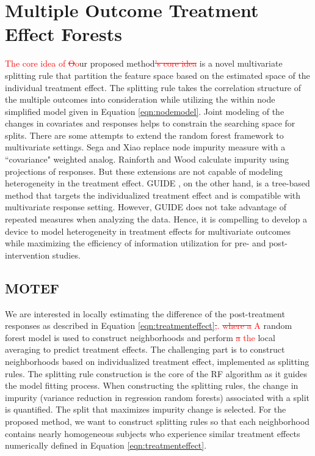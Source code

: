 \documentclass[smallextended]{svjour3}
\newcommand{\bg}[1]{\textcolor{red}{#1}}
\begin{document}
\section{Multiple Outcome Treatment Effect Forests}\label{MOTE}
\bg{The core idea of \st{O}o}ur proposed method\bg{\st{'s core idea}} is a novel multivariate splitting rule that partition the feature space based on the estimated space of the individual treatment effect. The splitting rule takes the correlation structure of the multiple outcomes into consideration while utilizing the within node simplified model given in Equation \eqref{eqn:nodemodel}. Joint modeling of the changes in covariates and responses helps to constrain the searching space for splits. There are some attempts to extend the random forest framework to multivariate settings. Sega and Xiao \cite{Sega2011} replace node impurity measure with a ``covariance" weighted analog. Rainforth and Wood \citep{Rainforth2015} calculate impurity using projections of responses. But these extensions are not capable of modeling heterogeneity in the treatment effect. GUIDE \citep{Loh2015}, on the other hand, is a tree-based method that targets the individualized treatment effect and is compatible with multivariate response setting. However, GUIDE does not take advantage of repeated measures when analyzing the data. Hence, it is compelling to develop a device to model heterogeneity in treatment effects for multivariate outcomes while maximizing the efficiency of information utilization for pre- and post-intervention studies.

\subsection{MOTEF}
We are interested in locally estimating the difference of the post-treatment responses as described in Equation \eqref{eqn:treatmenteffect}\bg{\st{,}.} \bg{\st{where a} A} random forest model is used to construct neighborhoods and perform \bg{\st{a} the} local averaging to predict treatment effects. The challenging part is to construct neighborhoods based on individualized treatment effect, implemented as splitting rules. The splitting rule construction is the core of the RF algorithm as it guides the model fitting process. When constructing the splitting rules, the change in impurity (variance reduction in regression random forests) associated with a split is quantified. The split that maximizes impurity change is selected. For the proposed method, we want to construct splitting rules so that each neighborhood contains nearly homogeneous subjects who experience similar treatment effects numerically defined in Equation \eqref{eqn:treatmenteffect}. 
\end{document}
